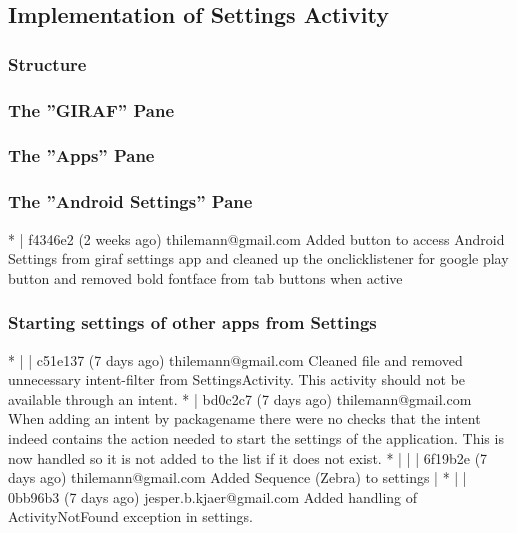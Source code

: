 \subsection{Implementation of Settings Activity}

\subsubsection{Structure}

\subsubsection{The ''GIRAF'' Pane}


\subsubsection{The ''Apps'' Pane}


 \subsubsection{The ''Android Settings'' Pane}
 * | f4346e2 (2 weeks ago) thilemann@gmail.com Added button to access Android Settings from giraf settings app and cleaned up the onclicklistener for google play button and removed bold fontface from tab buttons when active\\
 
 \subsubsection{Starting settings of other apps from Settings}
 * | | c51e137 (7 days ago) thilemann@gmail.com Cleaned file and removed unnecessary intent-filter from SettingsActivity. This activity should not be available through an intent.
 * | bd0c2c7 (7 days ago) thilemann@gmail.com When adding an intent by packagename there were no checks that the intent indeed contains the action needed to start the settings of the application. This is now
 handled so it is not added to the list if it does not exist.
 * | | | 6f19b2e (7 days ago) thilemann@gmail.com Added Sequence (Zebra) to settings
 | * | | 0bb96b3 (7 days ago) jesper.b.kjaer@gmail.com Added handling of ActivityNotFound exception in settings.